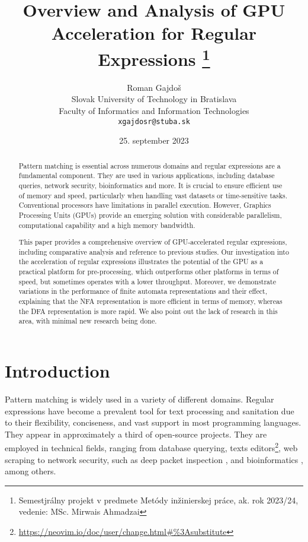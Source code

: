 \documentclass[10pt,onecolumn,twoside,english,a4paper]{article}
\title{Overview and Analysis of GPU Acceleration for Regular Expressions
\thanks{Semestjrálny projekt v predmete Metódy inžinierskej práce, ak. rok 2023/24, vedenie: MSc. Mirwais Ahmadzai}} %
\author{Roman Gajdoš\\[2pt]
	{\small Slovak University of Technology in Bratislava}\\
	{\small Faculty of Informatics and Information Technologies}\\
	{\small \texttt{xgajdosr@stuba.sk}}
	}
\date{\small 25. september 2023} %
\begin{document}
\maketitle

\begin{abstract}
  Pattern matching is essential across numerous domains and regular expressions are a fundamental component. They are used in various applications, including database queries, network security, bioinformatics and more. It is crucial to ensure efficient use of memory and speed, particularly when handling vast datasets or time-sensitive tasks.
  Conventional processors have limitations in parallel execution. However, Graphics Processing Units (GPUs) provide an emerging solution with considerable parallelism, computational capability and a high memory bandwidth.

  This paper provides a comprehensive overview of GPU-accelerated regular expressions, including comparative analysis and reference to previous studies. Our investigation into the acceleration of regular expressions illustrates the potential of the GPU as a practical platform for pre-processing, which outperforms other platforms in terms of speed, but sometimes operates with a lower throughput. Moreover, we demonstrate variations in the performance of finite automata representations and their effect, explaining that the NFA representation is more efficient in terms of memory, whereas the DFA representation is more rapid. We also point out the lack of research in this area, with minimal new research being done.
\end{abstract}

\section{Introduction} \label{Introduction}
Pattern matching is widely used in a variety of different domains. Regular expressions have become a prevalent tool for text processing and sanitation due to their flexibility, conciseness, and vast support in most programming languages\cite{Chapman:Usage}. They appear in approximately a third of open-source projects\cite{Davis:Re-use}. They are employed in technical fields, ranging from database querying\cite{István:databases-regex}, texts editors\footnote{\url{https://neovim.io/doc/user/change.html\#\%3Asubstitute}}, web scraping \cite{Gunawan2019/03} to network security, such as deep packet inspection \cite{becchi2008workload}, and bioinformatics \cite{huang2008gpu}, among others.
\end{document}
